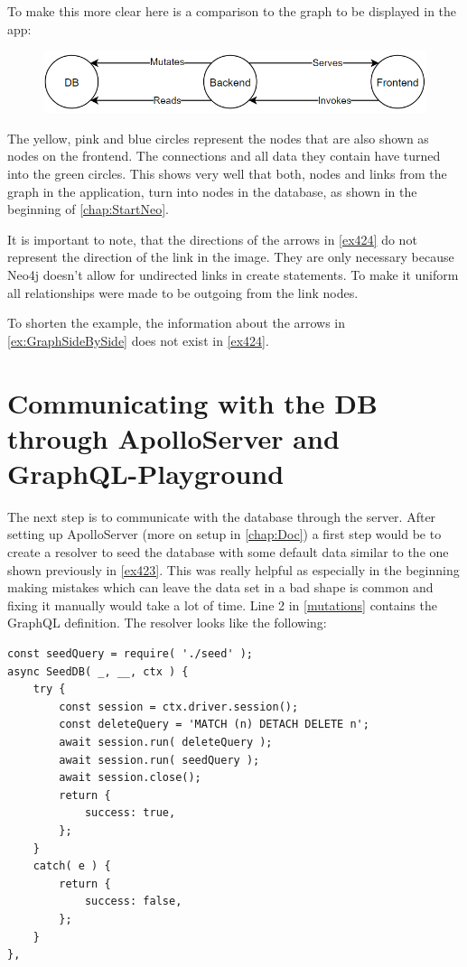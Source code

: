 To make this more clear here is a comparison to the graph to be displayed in the app:
\begin{figure}[H]
\centering
\includegraphics[scale=.8]{Bilder/BasicGraph.png}
\label{ex:GraphSideBySide}
\end{figure}

The yellow, pink and blue circles represent the nodes that are also shown as nodes on the frontend. The connections and all data they contain have turned into the green circles. This shows very well that both, nodes and links from the graph in the application, turn into nodes in the database, as shown in the beginning of \autoref{chap:StartNeo}.

It is important to note, that the directions of the arrows in \autoref{ex424} do not represent the direction of the link in the image. They are only necessary because Neo4j doesn't allow for undirected links in create statements. To make it uniform all relationships were made to be outgoing from the link nodes.

To shorten the example, the information about the arrows in \autoref{ex:GraphSideBySide} does not exist in \autoref{ex424}. 

\section{Communicating with the DB through ApolloServer and GraphQL-Playground}
The next step is to communicate with the database through the server. After setting up ApolloServer (more on setup in \autoref{chap:Doc}) a first step would be to create a resolver to seed the database with some default data similar to the one shown previously in \autoref{ex423}. This was really helpful as especially in the beginning making mistakes which can leave the data set in a bad shape is common and fixing it manually would take a lot of time. Line 2 in \autoref{mutations} contains the GraphQL definition. 
\newpage
The resolver looks like the following:
\lstset{language=JavaScript}
\begin{lstlisting}[caption={Seed Resolver}]
const seedQuery = require( './seed' );
async SeedDB( _, __, ctx ) {
	try {
		const session = ctx.driver.session();
		const deleteQuery = 'MATCH (n) DETACH DELETE n';
		await session.run( deleteQuery );
		await session.run( seedQuery );
		await session.close();
		return {
			success: true,
		};
	}
	catch( e ) {
		return {
			success: false,
		};	
	}
},
\end{lstlisting}

